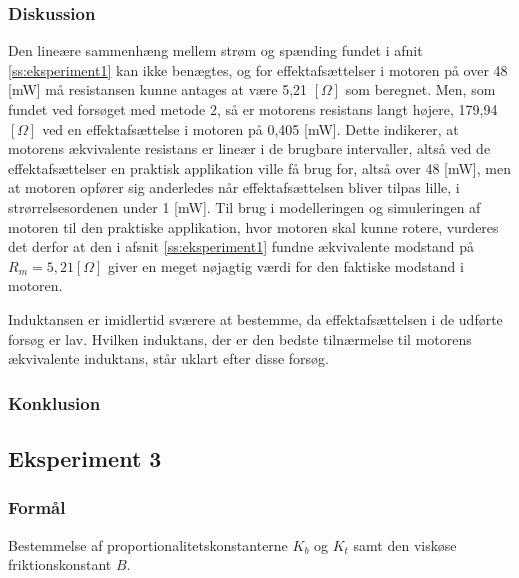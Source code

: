 \subsubsection{Diskussion}
Den lineære sammenhæng mellem strøm og spænding fundet i afnit \ref{ss:eksperiment1} kan ikke benægtes,
og for effektafsættelser i motoren på over 48 [mW] må resistansen kunne antages at være 5,21 \([\Omega]\) som beregnet.
Men, som fundet ved forsøget med metode 2, så er motorens resistans langt højere,
179,94 \([\Omega]\) ved en effektafsættelse i motoren på 0,405 [mW].
Dette indikerer, at motorens ækvivalente resistans er lineær i de brugbare intervaller, altså ved de effektafsættelser en
praktisk applikation ville få brug for, altså over 48 [mW], men at motoren opfører sig anderledes når effektafsættelsen
bliver tilpas lille, i strørrelsesordenen under 1 [mW].
Til brug i modelleringen og simuleringen af motoren til den praktiske applikation, hvor motoren skal kunne rotere,
vurderes det derfor at den i afsnit \ref{ss:eksperiment1} fundne ækvivalente modstand på \(R_m=5,21 [\Omega]\) giver en meget
nøjagtig værdi for den faktiske modstand i motoren.

Induktansen er imidlertid sværere at bestemme, da effektafsættelsen i de udførte forsøg er lav.
Hvilken induktans, der er den bedste tilnærmelse til motorens ækvivalente induktans,
står uklart efter disse forsøg.

\subsubsection{Konklusion}


\subsection{Eksperiment 3}
\label{ss:eksperiment3}
\subsubsection{Formål}
Bestemmelse af proportionalitetskonstanterne \(K_b\) og \(K_t\) samt den viskøse friktionskonstant \(B\).
